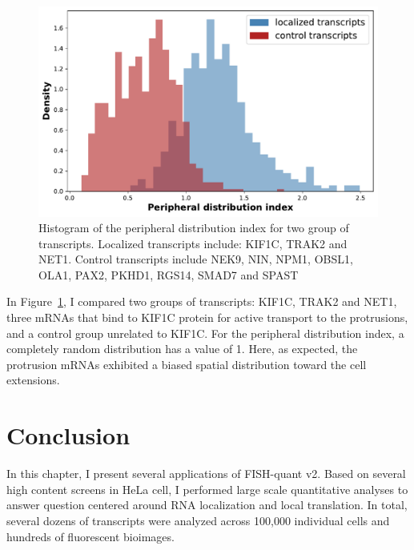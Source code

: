 \begin{figure}[]
    \centering
    \includegraphics[width=\textwidth]{figures/chapter5/helacentrin_distribution_pdi}
    \caption[Histogram of the peripheral distribution index]{Histogram of the peripheral distribution index for two group of transcripts.
	Localized transcripts include: KIF1C, TRAK2 and NET1.
	Control transcripts include NEK9, NIN, NPM1, OBSL1, OLA1, PAX2, PKHD1, RGS14, SMAD7 and SPAST}
    \label{fig:xavier_pdi}
\end{figure}

In Figure~\ref{fig:xavier_pdi}, I compared two groups of transcripts: KIF1C, TRAK2 and NET1, three \ac{mRNA}s that bind to KIF1C protein for active transport to the protrusions, and a control group unrelated to KIF1C.
For the peripheral distribution index, a completely random distribution has a value of 1.
Here, as expected, the protrusion \ac{mRNA}s exhibited a biased spatial distribution toward the cell extensions.

\section{Conclusion}
\label{sec:conclusion_chapter5}

In this chapter, I present several applications of FISH-quant v2.
Based on several high content screens in HeLa cell, I performed large scale quantitative analyses to answer question centered around RNA localization and local translation.
In total, several dozens of transcripts were analyzed across 100,000 individual cells and hundreds of fluorescent bioimages.

